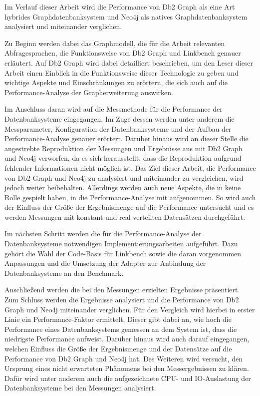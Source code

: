 Im Verlauf dieser Arbeit wird die Performance von Db2 Graph als eine Art hybrides Graphdatenbanksystem und Neo4j als natives Graphdatenbanksystem analysiert und miteinander verglichen. 

Zu Beginn werden dabei das Graphmodell, die für die Arbeit relevanten Abfragesprachen, die Funktionsweise von Db2 Graph und Linkbench genauer erläutert. Auf Db2 Graph wird dabei detailliert beschrieben, um den Leser dieser Arbeit einen Einblick in die Funktionsweise dieser Technologie zu geben und wichtige Aspekte und Einschränkungen zu erörtern, die sich auch auf die Performance-Analyse der Grapherweiterung auswirken.

Im Anschluss daran wird auf die Messmethode für die Performance der Datenbanksysteme eingegangen. Im Zuge dessen werden unter anderem die Messparameter, Konfiguration der Datenbanksysteme und der Aufbau der Performance-Analyse genauer erörtert. Darüber hinaus wird an dieser Stelle die angestrebte Reproduktion der Messungen und Ergebnisse aus \cite{sigmod_tian} mit Db2 Graph und Neo4j verworfen, da es sich herausstellt, dass die Reproduktion aufgrund fehlender Informationen nicht möglich ist. Das Ziel dieser Arbeit, die Performance von Db2 Graph und Neo4j zu analysiert und miteinander zu vergleichen, wird jedoch weiter beibehalten. Allerdings werden auch neue Aspekte, die in \cite{sigmod_tian} keine Rolle gespielt haben, in die Performance-Analyse mit aufgenommen. So wird auch der Einfluss der Größe der Ergebnismenge auf die Performance untersucht und es werden Messungen mit konstant und real verteilten Datensätzen durchgeführt.  

Im nächsten Schritt werden die für die Performance-Analyse der Datenbanksysteme notwendigen Implementierungsarbeiten aufgeführt. Dazu gehört die Wahl der Code-Basis für Linkbench sowie die daran vorgenommen Anpassungen und die Umsetzung der Adapter zur Anbindung der Datenbanksysteme an den Benchmark. 

Anschließend werden die bei den Messungen erzielten Ergebnisse präsentiert. Zum Schluss werden die Ergebnisse analysiert und die Performance von Db2 Graph und Neo4j miteinander verglichen. Für den Vergleich wird hierbei in erster Linie ein Performance-Faktor ermittelt. Dieser gibt dabei an, wie hoch die Performance eines Datenbanksystems gemessen an dem System ist, dass die niedrigste Performance aufweist. Darüber hinaus wird auch darauf eingegangen, welchen Einfluss die Größe der Ergebnismenge und der Datensätze auf die Performance von Db2 Graph und Neo4j hat. Des Weiteren wird versucht, den Ursprung eines nicht erwarteten Phänomens bei den Messergebnissen zu klären. Dafür wird unter anderem auch die aufgezeichnete CPU- und IO-Auslastung der Datenbanksysteme bei den Messungen analysiert.